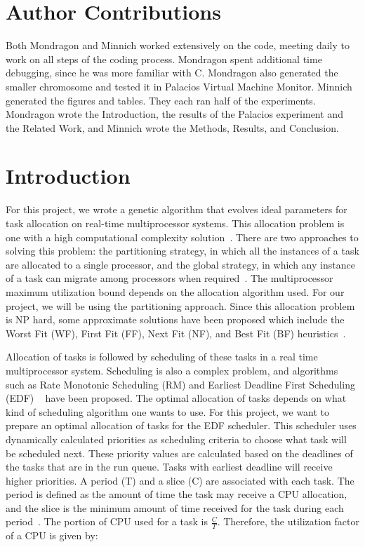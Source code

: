 \documentclass[11pt]{article}
\begin{document}
\maketitle
\doublespacing

\section{Author Contributions}
Both Mondragon and Minnich worked extensively on the code, meeting daily to work on all steps of the coding process. Mondragon spent additional time debugging, since he was more familiar with C. Mondragon also generated the smaller chromosome and tested it in Palacios Virtual Machine Monitor. Minnich generated the figures and tables. They each ran half of the experiments. Mondragon wrote the Introduction, the results of the Palacios experiment and the Related Work, and Minnich wrote the Methods, Results, and Conclusion.

\section{Introduction}

For this project, we wrote a genetic algorithm that evolves ideal parameters for task allocation on real-time multiprocessor systems. This allocation problem is one with a high computational complexity solution~\cite{Mondragon:13}. There are two approaches to solving this problem: the partitioning strategy, in which all the instances of a task are allocated to a single processor, and the global strategy, in which any instance of a task can migrate among processors when required~\cite{Lopez:04}. The multiprocessor maximum utilization bound depends on the allocation algorithm used. For our project, we will be using the partitioning approach.  Since this allocation problem is NP hard, some approximate solutions have been proposed which include the Worst Fit (WF), First Fit (FF), Next Fit (NF), and Best Fit (BF) heuristics~\cite{Zapata:05}. 

Allocation of tasks is followed by scheduling of these tasks in a real time multiprocessor system. Scheduling is also a complex problem, and algorithms such as Rate Monotonic Scheduling (RM) and Earliest Deadline First Scheduling (EDF) ~\cite{Dall:78} have been proposed. The optimal allocation of tasks depends on what kind of scheduling algorithm one wants to use. For this project, we want to prepare an optimal allocation of tasks for the EDF scheduler. This scheduler uses dynamically calculated priorities as scheduling criteria to choose what task will be scheduled next. These priority values are calculated based on the deadlines of the tasks that are in the run queue. Tasks with earliest deadline will receive higher priorities. A period (T) and a slice (C) are associated with each task. The period is defined as the amount of time the task may receive a CPU allocation, and the slice is the minimum amount of time received for the task during each period~\cite{Chung:73}. The portion of CPU used for a task is $\frac{C}{T}$. Therefore, the utilization factor of a CPU is given by: 
\end{document}
